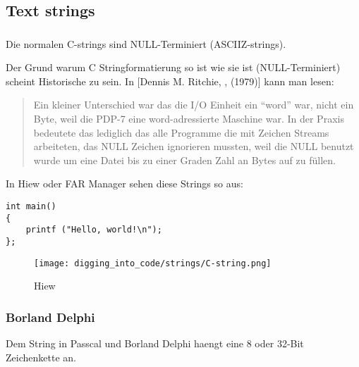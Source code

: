 \subsection{Text strings}

\subsubsection{\CCpp}

\label{C_strings}

Die normalen C-strings sind NULL-Terminiert (\ac{ASCIIZ}-strings).

Der Grund warum C Stringformatierung so ist wie sie ist (NULL-Terminiert) scheint Historische zu sein.
In [Dennis M. Ritchie, , (1979)] kann man lesen:

\begin{framed}
\begin{quotation}
Ein kleiner Unterschied war das die I/O Einheit ein ``word'' war, nicht ein Byte, weil die PDP-7 eine word-adressierte
Maschine war. In der Praxis bedeutete das lediglich das alle Programme die mit Zeichen Streams arbeiteten, das NULL 
Zeichen ignorieren mussten, weil die NULL benutzt wurde um eine Datei bis zu einer Graden Zahl an Bytes auf zu füllen.

\end{quotation}
\end{framed}


In Hiew oder FAR Manager sehen diese Strings so aus:

\begin{lstlisting}[style=customc]
int main()
{
	printf ("Hello, world!\n");
};
\end{lstlisting}

\begin{figure}[H]
\centering
\texttt{[image: digging\_into\_code/strings/C-string.png]}
\caption{Hiew}
\end{figure}


\subsubsection{Borland Delphi}

Dem String in Passcal und Borland Delphi haengt eine 8 oder 32-Bit Zeichenkette an. 

